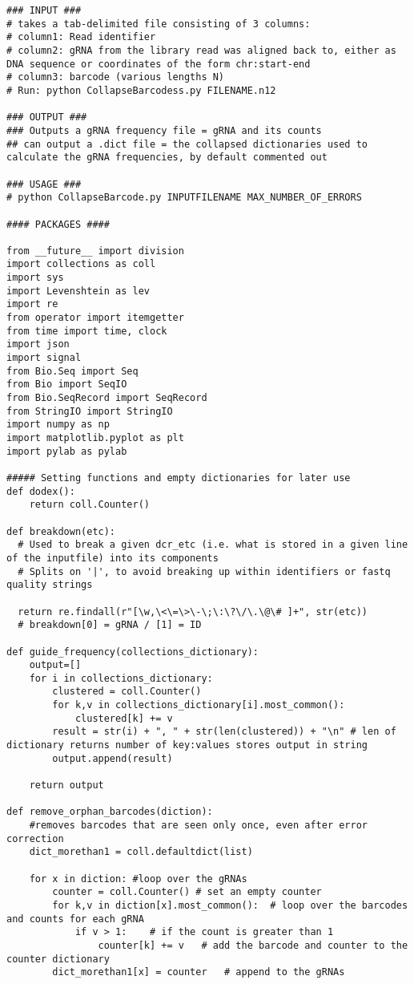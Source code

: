 \begin{footnotesize}
\begin{lstlisting}
### INPUT ###
# takes a tab-delimited file consisting of 3 columns:
# column1: Read identifier
# column2: gRNA from the library read was aligned back to, either as DNA sequence or coordinates of the form chr:start-end
# column3: barcode (various lengths N)
# Run: python CollapseBarcodess.py FILENAME.n12

### OUTPUT ###
### Outputs a gRNA frequency file = gRNA and its counts
## can output a .dict file = the collapsed dictionaries used to calculate the gRNA frequencies, by default commented out

### USAGE ###
# python CollapseBarcode.py INPUTFILENAME MAX_NUMBER_OF_ERRORS

#### PACKAGES ####

from __future__ import division
import collections as coll
import sys
import Levenshtein as lev
import re
from operator import itemgetter
from time import time, clock
import json
import signal
from Bio.Seq import Seq
from Bio import SeqIO
from Bio.SeqRecord import SeqRecord
from StringIO import StringIO
import numpy as np
import matplotlib.pyplot as plt
import pylab as pylab

##### Setting functions and empty dictionaries for later use
def dodex():
    return coll.Counter()

def breakdown(etc):
  # Used to break a given dcr_etc (i.e. what is stored in a given line of the inputfile) into its components
  # Splits on '|', to avoid breaking up within identifiers or fastq quality strings

  return re.findall(r"[\w,\<\=\>\-\;\:\?\/\.\@\# ]+", str(etc))
  # breakdown[0] = gRNA / [1] = ID

def guide_frequency(collections_dictionary):
    output=[]
    for i in collections_dictionary:
        clustered = coll.Counter()
        for k,v in collections_dictionary[i].most_common():
            clustered[k] += v
        result = str(i) + ", " + str(len(clustered)) + "\n" # len of dictionary returns number of key:values stores output in string
        output.append(result)

    return output

def remove_orphan_barcodes(diction):
    #removes barcodes that are seen only once, even after error correction
    dict_morethan1 = coll.defaultdict(list)

    for x in diction: #loop over the gRNAs
        counter = coll.Counter() # set an empty counter
        for k,v in diction[x].most_common():  # loop over the barcodes and counts for each gRNA
            if v > 1:    # if the count is greater than 1
                counter[k] += v   # add the barcode and counter to the counter dictionary
        dict_morethan1[x] = counter   # append to the gRNAs


\end{lstlisting}
\end{footnotesize}
